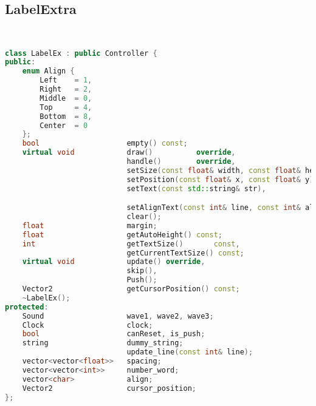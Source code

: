 \subsection{LabelExtra}
\begin{lstlisting}[language=C++]


class LabelEx : public Controller {
public:
    enum Align {
        Left    = 1,
        Right   = 2,
        Middle  = 0,
        Top     = 4,
        Bottom  = 8,
        Center  = 0
    };
    bool                    empty() const;
    virtual void            draw()          override,
                            handle()        override,
                            setSize(const float& width, const float& height) override,
                            setPosition(const float& x, const float& y) override,
                            setText(const std::string& str),

                            setAlignText(const int& line, const int& align),
                            clear();
    float                   margin;
    float                   getAutoHeight() const;
    int                     getTextSize()       const,
                            getCurrentTextSize() const;
    virtual void            update() override,
                            skip(),
                            Push();
    Vector2                 getCursorPosition() const;
    ~LabelEx();
protected:
    Sound                   wave1, wave2, wave3;
    Clock                   clock;
    bool                    canReset, is_push;
    string                  dummy_string;
                            update_line(const int& line);
    vector<vector<float>>   spacing;
    vector<vector<int>>     number_word;
    vector<char>            align;
    Vector2                 cursor_position;
};






\end{lstlisting}
